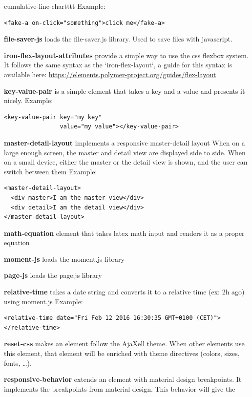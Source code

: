 \begin{labeling}{cumulative-line-chartttt}
Example:
\begin{verbatim}
<fake-a on-click="something">click me</fake-a>
\end{verbatim}
\item [\textbf{file-saver-js}] loads the file-saver.js library. Used to save files with javascript.
\item [\textbf{iron-flex-layout-attributes}] provide a simple way to use the css flexbox system.
It follows the same syntax as the `iron-flex-layout`, a guide for this syntax
is available here: \url{https://elements.polymer-project.org/guides/flex-layout}
\item [\textbf{key-value-pair}] is a simple element that takes a key and a value and presents it nicely.
Example:
\begin{verbatim}
<key-value-pair key="my key"
                value="my value"></key-value-pair>
\end{verbatim}
\item [\textbf{master-detail-layout}] implements a responsive master-detail layout
When on a large enough screen, the master and detail view are displayed side to side. When on a small device, either the master or the detail view is shown, and the user can switch between them
Example:
\begin{verbatim}
<master-detail-layout>
  <div master>I am the master view</div>
  <div detail>I am the detail view</div>
</master-detail-layout>
\end{verbatim}
\item [\textbf{math-equation}] element that takes latex math input and renders it as a proper equation
\item [\textbf{moment-js}] loads the moment.js library
\item [\textbf{page-js}] loads the page.js library
\item [\textbf{relative-time}] takes a date string and converts it to a relative time (ex: 2h ago) using moment.js
Example:
\begin{verbatim}
<relative-time date="Fri Feb 12 2016 16:30:35 GMT+0100 (CET)">
</relative-time>
\end{verbatim}
\item [\textbf{reset-css}] makes an element follow the AjaXell theme.
When other elements use this element, that element will be enriched with theme
directives (colors, sizes, fonts, \ldots).
\item [\textbf{responsive-behavior}] extends an element with material design breakpoints.
It implements the breakpoints from material design. This behavior will give the

\end{labeling}
